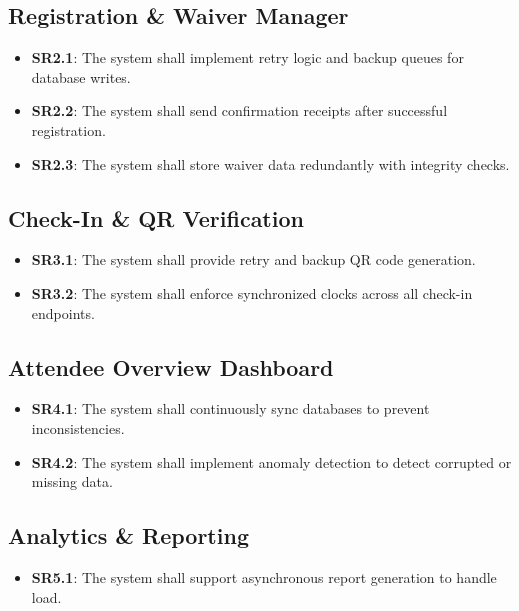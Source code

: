 \documentclass[12pt]{article}
\begin{document}
\subsection{Registration \& Waiver Manager}
\begin{itemize}
    \item \textbf{SR2.1}: The system shall implement retry logic and backup queues for database writes.
    \item \textbf{SR2.2}: The system shall send confirmation receipts after successful registration.
    \item \textbf{SR2.3}: The system shall store waiver data redundantly with integrity checks.
\end{itemize}

\subsection{Check-In \& QR Verification}
\begin{itemize}
    \item \textbf{SR3.1}: The system shall provide retry and backup QR code generation.
    \item \textbf{SR3.2}: The system shall enforce synchronized clocks across all check-in endpoints.
\end{itemize}

\subsection{Attendee Overview Dashboard}
\begin{itemize}
    \item \textbf{SR4.1}: The system shall continuously sync databases to prevent inconsistencies.
    \item \textbf{SR4.2}: The system shall implement anomaly detection to detect corrupted or missing data.
\end{itemize}

\subsection{Analytics \& Reporting}
\begin{itemize}
    \item \textbf{SR5.1}: The system shall support asynchronous report generation to handle load.
\end{itemize}
\end{document}
